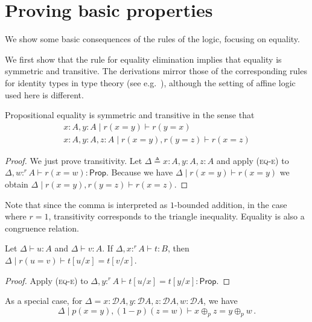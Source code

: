 \documentclass[a4paper,UKenglish,cleveref, autoref, thm-restate]{lipics-v2021}
\newcommand{\ts}{\vdash}
\newcommand{\hastype}[3]{#1\ts #2 : #3}
\newcommand{\Prop}{\mathsf{Prop}}
\newcommand{\TD}{\mathcal{D}}
\newcommand{\logicJ}[3][\Delta]{#1 \mid #2 \vdash #3}
\newcommand{\peq}{=}
\newcommand{\defeq}{\triangleq}
\begin{document}
\section{Proving basic properties}
\label{sec:basic:prop}

We show some basic consequences of the rules of the logic, focusing on equality. 

We first show that the rule  for equality elimination implies that equality is symmetric and transitive. The derivations mirror those of the corresponding rules for identity types in type theory (see e.g.~\cite{hottbook}), although 
the setting of affine logic used here is different. 

\begin{proposition} \label{prop:eq:symm:trans}
 Propositional equality is symmetric and transitive in the sense that 
\begin{align*}
 x : A, y: A \mid r(x\peq y)  \ts r(y\peq x) \\
 x:A, y:A, z:A \mid r(x\peq y), r(y\peq z)  \ts r(x \peq z)
\end{align*}
\end{proposition}
\begin{proof}
We just prove transitivity. Let $\Delta \defeq x:A, y:A, z :A$ and apply (\textsc{eq-e}) to $\hastype{\Delta, w :^r A}{r(x\peq w)}{\Prop}$. 
Because we have 
  $\logicJ{r(x\!\peq \!y)}{r(x\!\peq\! y)}$
we obtain 
  $\logicJ{r(x\!\peq\! y), r(y\!\peq\! z)}{r(x\! \peq\! z)}$. %
\end{proof}
Note that since the comma is interpreted as $1$-bounded addition, in the case where $r=1$, transitivity corresponds to the triangle inequality. 
Equality is also a congruence relation.


\begin{proposition}[Congruence] \label{prop:eq:congruence}
 Let $\hastype\Delta uA$ and $\hastype\Delta vA$. If $\hastype{\Delta, x:^rA}{t}B$, then $\logicJ{r(u\peq v)}{t[u/x] \peq t[v/x]}$.
\end{proposition}
\begin{proof}
 Apply (\textsc{eq-e}) to $\hastype{\Delta, y:^r A}{t[u/x]\peq t[y/x]}{\Prop}$.
\end{proof}
As a special case, for $\Delta = x:\TD A, y:\TD A, z :\TD A, w:\TD A$, we have
\begin{equation} \label{eq:oplus:peq}
  \logicJ{p(x \peq y), (1-p)(z \peq w)}{x \oplus_p z \peq y \oplus_p w} \,.
\end{equation}
\end{document}
